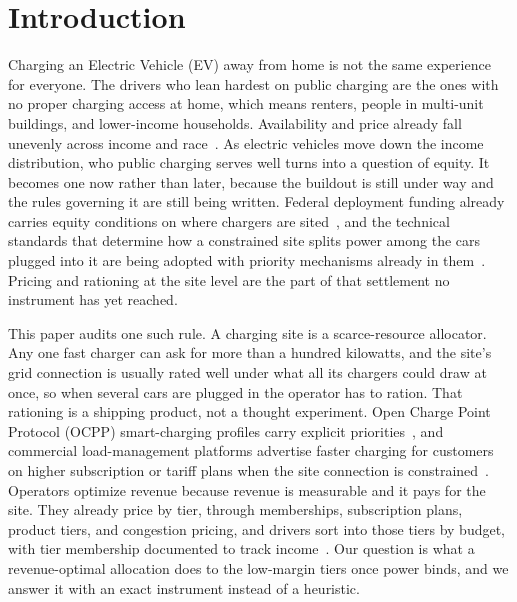 \documentclass[manuscript, screen, review, anonymous]{acmart}
\begin{document}

\maketitle

\section{Introduction}

Charging an Electric Vehicle (EV) away from home is not the same experience for everyone. The drivers who lean hardest on public charging are the ones with no proper charging access at home, which means renters, people in multi-unit buildings, and lower-income households. Availability and price already fall unevenly across income and race~\cite{hsu2021public,khan2022inequitable,caulfield2022measuring}. As electric vehicles move down the income distribution, who public charging serves well turns into a question of equity. It becomes one now rather than later, because the buildout is still under way and the rules governing it are still being written. Federal deployment funding already carries equity conditions on where chargers are sited~\cite{fhwa2023nevi}, and the technical standards that determine how a constrained site splits power among the cars plugged into it are being adopted with priority mechanisms already in them~\cite{ocpp201}. Pricing and rationing at the site level are the part of that settlement no instrument has yet reached.

This paper audits one such rule. A charging site is a scarce-resource allocator. Any one fast charger can ask for more than a hundred kilowatts, and the site's grid connection is usually rated well under what all its chargers could draw at once, so when several cars are plugged in the operator has to ration. That rationing is a shipping product, not a thought experiment. Open Charge Point Protocol (OCPP) smart-charging profiles carry explicit priorities~\cite{ocpp201}, and commercial load-management platforms advertise faster charging for customers on higher subscription or tariff plans when the site connection is constrained~\cite{ampeco2026}. Operators optimize revenue because revenue is measurable and it pays for the site. They already price by tier, through memberships, subscription plans, product tiers, and congestion pricing, and drivers sort into those tiers by budget, with tier membership documented to track income~\cite{drehobl2020high,hsu2021public}. Our question is what a revenue-optimal allocation does to the low-margin tiers once power binds, and we answer it with an exact instrument instead of a heuristic.
\end{document}
